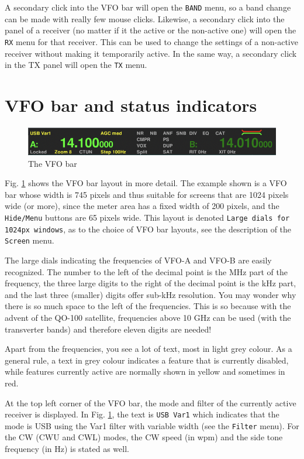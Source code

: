 \documentclass[12pt]{book}
\begin{document}
A secondary click into the VFO bar will open the \texttt{BAND} menu,
so a band change can be made with really few mouse clicks. Likewise,
a secondary click into the panel of a receiver (no matter if it
the active or the non-active one) will open the \texttt{RX} menu
for that receiver. This can be used to change the settings of a
non-active receiver without making it temporarily active. In the
same way, a secondary click in the TX panel will open the
\texttt{TX} menu.

\section{VFO bar and status  indicators}
\begin{figure}[h]
\center
\includegraphics[width=12cm]{VFObar.png}
\caption{The VFO bar}
\label{fig:VFObar}
\end{figure}

Fig. \ref{fig:VFObar} shows the VFO bar layout in more  detail.
The example shown is a VFO bar whose width is 745 pixels and
thus suitable for screens that are 1024 pixels wide (or more),
since the meter area has a fixed width of 200 pixels, and
the \texttt{Hide/Menu} buttons are 65 pixels wide. This layout is
denoted \texttt{Large dials for 1024px windows}, as to the choice
of VFO bar layouts, see the description of the \texttt{Screen} menu.

The large dials indicating the frequencies of VFO-A and VFO-B
are easily recognized. The number to the left of the decimal
point is the MHz part of the frequency, the three  large digits
to the right  of  the decimal point is the kHz part, and
the last three (smaller) digits offer sub-kHz resolution.
You may wonder why there is  so much space to the left of
the frequencies. This is so because with the advent of
the QO-100 satellite, frequencies above 10 GHz can be
used (with the transverter bands) and therefore eleven
digits are needed!

Apart from the frequencies, you see a lot  of text, most in
light grey colour. As a general rule, a text  in grey
colour indicates a feature that is currently disabled,
while features currently active are normally shown in
yellow and sometimes in red.

At the top left  corner of the VFO bar, the mode and
filter of the currently active receiver is displayed. 
In Fig. \ref{fig:VFObar}, the text is \texttt{USB Var1}
which indicates that the  mode
is USB using the Var1 filter with variable width (see the \texttt{Filter} menu).
For the CW (CWU and CWL) modes, the CW speed (in wpm) and the side tone
frequency (in Hz) is stated as well.
\end{document}
